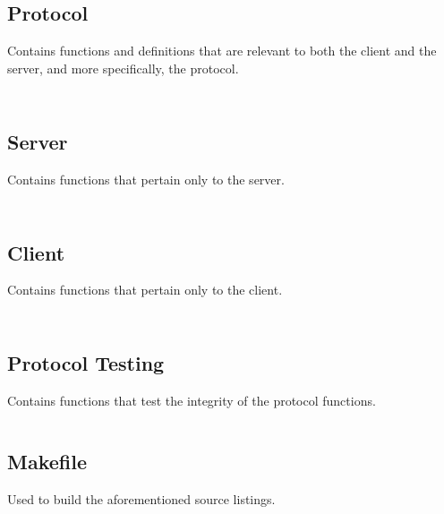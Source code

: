 \documentclass[11pt]{article} %
\newcommand{\includecode}[2][c]{\begin{mdframed}\inputminted[linenos=true, breaklines]{#1}{#2}\end{mdframed}}
\begin{document}
\newpage
\subsection{Protocol}
Contains functions and definitions that are relevant to both the client and the server, and more specifically, the protocol.
\includecode{../src/protocol.h}
\includecode{../src/protocol.c}

\newpage
\subsection{Server}
Contains functions that pertain only to the server.
\includecode{../src/server.h}
\includecode{../src/server.c}

\newpage
\subsection{Client}
Contains functions that pertain only to the client.
\includecode{../src/client.h}
\includecode{../src/client.c}

\newpage
\subsection{Protocol Testing}
Contains functions that test the integrity of the protocol functions.
\includecode{../src/test/protocol.test.c}

\newpage
\subsection{Makefile}
Used to build the aforementioned source listings.
\includecode[make]{../Makefile}
\end{document}
